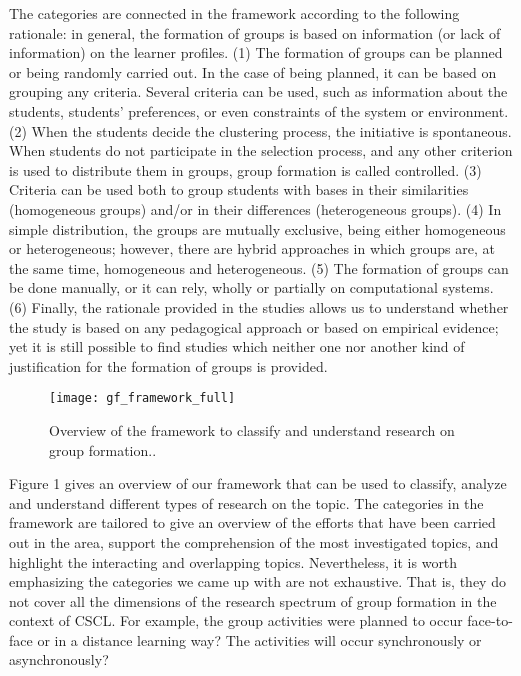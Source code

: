 The categories are connected in the framework according to the following rationale: in general, the formation of groups is based on information (or lack of information) on the learner profiles. (1) The formation of groups can be planned or being randomly carried out. In the case of being planned, it can be based on grouping any criteria. Several criteria can be used, such as information about the students, students’ preferences, or even constraints of the system or environment. (2) When the students decide the clustering process, the initiative is spontaneous. When students do not participate in the selection process, and any other criterion is used to distribute them in groups, group formation is called controlled. (3) Criteria can be used both to group students with bases in their similarities (homogeneous groups) and/or in their differences (heterogeneous groups). (4) In simple distribution, the groups are mutually exclusive, being either homogeneous or heterogeneous; however, there are hybrid approaches in which groups are, at the same time, homogeneous and heterogeneous. (5) The formation of groups can be done manually, or it can rely, wholly or partially on computational systems. (6) Finally, the rationale provided in the studies allows us to understand whether the study is based on any pedagogical approach or based on empirical evidence; yet it is still possible to find studies which neither one nor another kind of justification for the formation of groups is provided.
    
\begin{figure}[h!]
\caption{Overview of the framework to classify and understand research on group formation..}
\centering
\texttt{[image: gf\_framework\_full]}
\end{figure}

Figure 1 gives an overview of our framework that can be used to classify, analyze and understand different types of research on the topic. The categories in the framework are tailored to give an overview of the efforts that have been carried out in the area, support the comprehension of the most investigated topics, and highlight the interacting and overlapping topics. Nevertheless, it is worth emphasizing the categories we came up with are not exhaustive. That is, they do not cover all the dimensions of the research spectrum of group formation in the context of CSCL. For example, the group activities were planned to occur face-to-face or in a distance learning way? The activities will occur synchronously or asynchronously?

